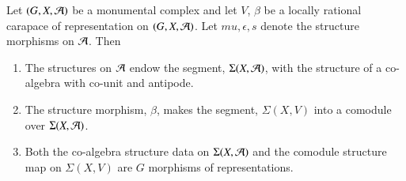\begin{prop}\label{cart6-proposition-13.2}
Let $(G, X, \mathcal{A})$ be a monumental complex and let $V$, $\beta$ be a locally rational carapace of representation on $(G, X, \mathcal{A})$. Let $mu, \epsilon, s$ denote the structure morphisms on $\mathcal{A}$. Then
\begin{enumerate}[(1)]
\item The structures on $\mathcal{A}$ endow the segment, $\Sigma(X, \mathcal{A})$, with the structure of a co-algebra with co-unit and antipode.\label{art6-proposition13.2-enum-1}

\item The structure morphism, $\beta$, makes the segment, $\Sigma(X, V)$ into a comodule
 over $\Sigma(X, \mathcal{A})$.\label{art6-proposition13.2-enum-2}

 \item Both the co-algebra structure data on $\Sigma(X, \mathcal{A})$ and the comodule structure map on $\Sigma(X, V)$ are $G$ morphisms of representations.\label{art6-proposition13.2-enum-3}
\end{enumerate}
\end{prop}


